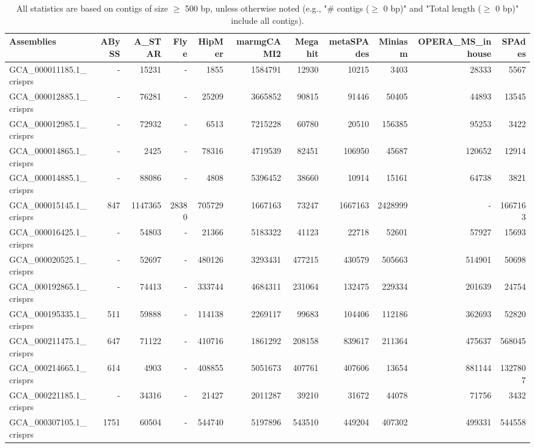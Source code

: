 \documentclass[12pt,a4paper]{article}
\begin{document}
\begin{table}[ht]
\begin{center}
\caption{All statistics are based on contigs of size $\geq$ 500 bp, unless otherwise noted (e.g., "\# contigs ($\geq$ 0 bp)" and "Total length ($\geq$ 0 bp)" include all contigs).}
\begin{tabular}{|l*{10}{|r}|}
\hline
Assemblies & ABySS & A\_STAR & Flye & HipMer & marmgCAMI2 & Megahit & metaSPAdes & Miniasm & OPERA\_MS\_inhouse & SPAdes \\ \hline
GCA\_000011185.1\_crisprs & - & 15231 & - & 1855 & 1584791 & 12930 & 10215 & 3403 & 28333 & 5567 \\ \hline
GCA\_000012885.1\_crisprs & - & 76281 & - & 25209 & 3665852 & 90815 & 91446 & 50405 & 44893 & 13545 \\ \hline
GCA\_000012985.1\_crisprs & - & 72932 & - & 6513 & 7215228 & 60780 & 20510 & 156385 & 95253 & 3422 \\ \hline
GCA\_000014865.1\_crisprs & - & 2425 & - & 78316 & 4719539 & 82451 & 106950 & 45687 & 120652 & 12914 \\ \hline
GCA\_000014885.1\_crisprs & - & 88086 & - & 4808 & 5396452 & 38660 & 10914 & 15161 & 64738 & 3821 \\ \hline
GCA\_000015145.1\_crisprs & 847 & 1147365 & 28380 & 705729 & 1667163 & 73247 & 1667163 & 2428999 & - & 1667163 \\ \hline
GCA\_000016425.1\_crisprs & - & 54803 & - & 21366 & 5183322 & 41123 & 22718 & 52601 & 57927 & 15693 \\ \hline
GCA\_000020525.1\_crisprs & - & 52697 & - & 480126 & 3293431 & 477215 & 430579 & 505663 & 514901 & 50698 \\ \hline
GCA\_000192865.1\_crisprs & - & 74413 & - & 333744 & 4684311 & 231064 & 132475 & 229334 & 201639 & 24754 \\ \hline
GCA\_000195335.1\_crisprs & 511 & 59888 & - & 114138 & 2269117 & 99683 & 104406 & 112186 & 362693 & 52820 \\ \hline
GCA\_000211475.1\_crisprs & 647 & 71122 & - & 410716 & 1861292 & 208158 & 839617 & 211364 & 475637 & 568045 \\ \hline
GCA\_000214665.1\_crisprs & 614 & 4903 & - & 408855 & 5051673 & 407761 & 407606 & 13654 & 881144 & 1327807 \\ \hline
GCA\_000221185.1\_crisprs & - & 34316 & - & 21427 & 2011287 & 39210 & 31672 & 44078 & 71756 & 3432 \\ \hline
GCA\_000307105.1\_crisprs & 1751 & 60504 & - & 544740 & 5197896 & 543510 & 449204 & 407302 & 499331 & 544558 \\ \hline

\end{tabular}
\end{center}
\end{table}
\end{document}
